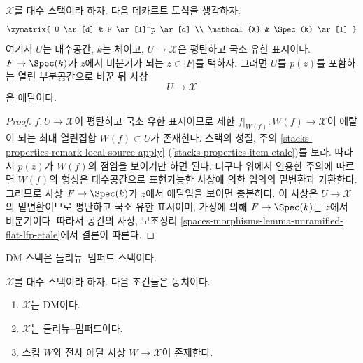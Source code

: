 \begin{lemma}
\label{lemma-etale-at-point}
$\mathcal{X}$를 대수 스택이라 하자. 다음 데카르트 도식을 생각하자.
$$
\xymatrix{
U \ar[d] & F \ar[l]^p \ar[d] \\
\mathcal{X} & \Spec(k) \ar[l]
}
$$
여기서 $U$는 대수공간, $k$는 체이고, $U \to \mathcal{X}$은 평탄하고
국소 유한 표시이다. $F \to \Spec(k)$가 $z$에서 비분기가 되는
$z \in |F|$를 택하자. 그러면 $U$를 $p(z)$를 포함하는 열린 부분공간으로
바꾼 뒤 사상
$$
U \longrightarrow \mathcal{X}
$$
은 에탈이다.
\end{lemma}

\begin{proof}
$f : U \to \mathcal{X}$이 평탄하고 국소 유한 표시이므로 제한
$f|_{W(f)} : W(f) \to \mathcal{X}$이 에탈이 되는 최대 열린집합
$W(f) \subset U$가 존재한다. 스택의 성질, 주의
\ref{stacks-properties-remark-local-source-apply}
(\ref{stacks-properties-item-etale})를 보라. 따라서 $p(z)$가 $W(f)$의
점임을 보이기만 하면 된다. 더구나 위에서 인용한 주의에 따르면
$W(f)$의 형성은 대수공간으로 표현가능한 사상에 의한 임의의 밑변환과
가환한다. 그러므로 사상 $F \to \Spec(k)$가 $z$에서 에탈임을 보이면
충분하다. 이 사상은 $U \to \mathcal{X}$의 밑변환이므로 평탄하고 국소
유한 표시이며, 가정에 의해 $F \to \Spec(k)$는 $z$에서 비분기이다.
따라서 공간의 사상,
보조정리 \ref{spaces-morphisms-lemma-unramified-flat-lfp-etale}에서 결론이
따른다.
\end{proof}

\noindent
DM 스택은 들리뉴–멈퍼드 스택이다.

\begin{theorem}
\label{theorem-DM}
$\mathcal{X}$를 대수 스택이라 하자. 다음 조건들은 동치이다.
\begin{enumerate}
\item $\mathcal{X}$는 DM이다.
\item $\mathcal{X}$는 들리뉴–멈퍼드이다.
\item 스킴 $W$와 전사 에탈 사상 $W \to \mathcal{X}$이 존재한다.
\end{enumerate}
\end{theorem}

